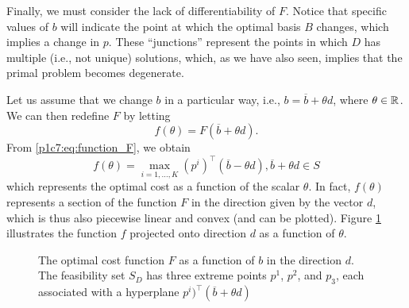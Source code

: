 Finally, we must consider the lack of differentiability of $F$. Notice that specific values of $b$ will indicate the point at which the optimal basis $B$ changes, which implies a change in $p$. These ``junctions'' represent the points in which $D$ has multiple (i.e., not unique) solutions, which, as we have also seen, implies that the primal problem becomes degenerate.

Let us assume that we change $b$ in a particular way, i.e., $b = \overline{b} + \theta d$, where $\theta \in \mathbb{R}$. We can then redefine $F$ by letting 
%
\begin{equation*}
	f(\theta) = F(\overline{b} + \theta d).
\end{equation*}
%
From \eqref{p1c7:eq:function_F}, we obtain
%
\begin{equation*}
	f(\theta) = \max_{i = 1, \dots, K} (p^i)^\top (\overline{b} - \theta d), \overline{b} + \theta d \in S
\end{equation*}
%
which represents the optimal cost as a function of the scalar $\theta$. In fact, $f(\theta)$ represents a section of the function $F$ in the direction given by the vector $d$, which is thus also piecewise linear and convex (and can be plotted). Figure \ref{p1c7:fig:b_function_theta} illustrates the function $f$ projected onto direction $d$ as a function of $\theta$.

\begin{figure}
	\caption{The optimal cost function $F$ as a function of $b$ in the direction $d$. The feasibility set $S_D$ has three extreme points $p^1$, $p^2$, and $p_3$, each associated with a hyperplane $p^i)^\top(\overline{b} + \theta d)$} \label{p1c7:fig:b_function_theta}
\end{figure}

